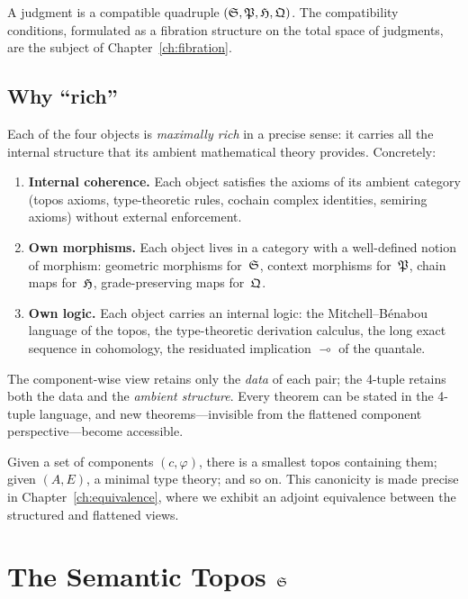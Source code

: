 A judgment is a compatible quadruple $(\mathfrak{S},\mathfrak{P},\mathfrak{H},\mathfrak{Q})$.
The compatibility conditions, formulated as a fibration structure on the
total space of judgments, are the subject of
Chapter~\ref{ch:fibration}.

\section{Why ``rich''}

Each of the four objects is \emph{maximally rich} in a precise sense: it
carries all the internal structure that its ambient mathematical
theory provides.  Concretely:

\begin{enumerate}[label=(\roman*),nosep]
\item \textbf{Internal coherence.}  Each object satisfies the axioms of
  its ambient category (topos axioms, type-theoretic rules, cochain
  complex identities, semiring axioms) without external enforcement.
\item \textbf{Own morphisms.}  Each object lives in a category with a
  well-defined notion of morphism: geometric morphisms for~$\mathfrak{S}$,
  context morphisms for~$\mathfrak{P}$, chain maps for~$\mathfrak{H}$,
  grade-preserving maps for~$\mathfrak{Q}$.
\item \textbf{Own logic.}  Each object carries an internal logic:
  the Mitchell--B\'enabou language of the topos, the type-theoretic
  derivation calculus, the long exact sequence in cohomology, the
  residuated implication $\multimap$ of the quantale.
\end{enumerate}

The component-wise view retains only the \emph{data} of each pair; the
4-tuple retains both the data and the \emph{ambient structure}.  Every
theorem can be stated in the 4-tuple language, and new
theorems---invisible from the flattened component
perspective---become accessible.

\begin{remark}
\label{rem:canonical}
Given a set of components $(c,\varphi)$, there is a smallest topos
containing them; given $(A,E)$, a minimal type theory; and so on.
This canonicity is made precise in
Chapter~\ref{ch:equivalence}, where we exhibit an adjoint equivalence
between the structured and flattened views.
\end{remark}

\chapter{The Semantic Topos \texorpdfstring{$\mathfrak{S}$}{S}}
\label{ch:stopos}

